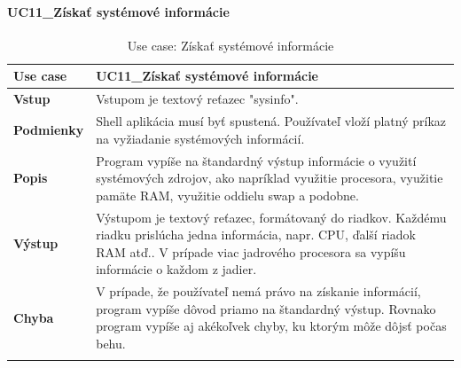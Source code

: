 \paragraph{UC11\_Získať systémové informácie}
\begin{center}
	\begin{longtable}{|p{2.5cm}|p{12.2cm}|}
		
			\hline
			\textbf{Use case} & UC11\_Získať systémové informácie \\ 
			\hline
			\textbf{Vstup} & Vstupom je textový reťazec "sysinfo".\\
			\hline
			\textbf{Podmienky} & Shell aplikácia musí byť spustená. Používateľ vloží platný príkaz na vyžiadanie systémových informácií. \\ 
			\hline
			\textbf{Popis} & Program vypíše na štandardný výstup informácie o využití systémových zdrojov,  ako napríklad využitie procesora, využitie pamäte RAM, využitie oddielu swap a podobne.\\ 
			\hline
					
			\textbf{Výstup} & Výstupom je textový reťazec, formátovaný do riadkov. Každému riadku prislúcha jedna informácia, napr. CPU, ďalší riadok RAM atď.. V prípade viac jadrového procesora sa vypíšu informácie o každom z jadier.  \\
			\hline
			\textbf{Chyba} & V prípade, že používateľ nemá právo na získanie informácií, program vypíše dôvod priamo na štandardný výstup. Rovnako program vypíše aj akékoľvek chyby, ku ktorým môže dôjsť počas behu.\\
			\hline
		\caption{Use case: Získať systémové informácie}
		\label{table:1}
		
	\end{longtable}
\end{center}

